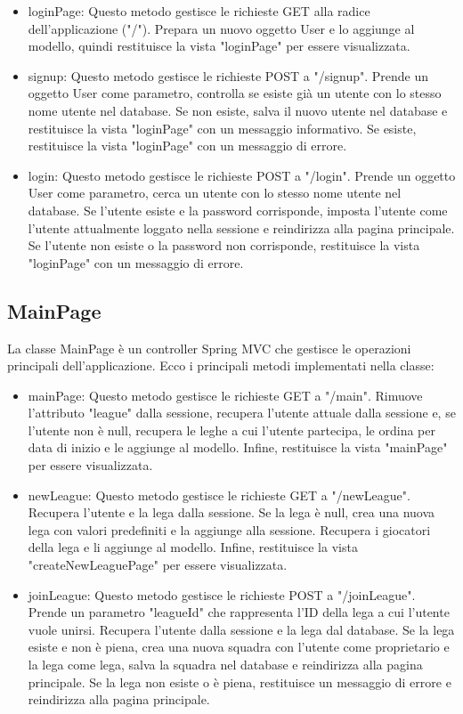 \documentclass[twoside,openright,titlepage,fleqn,headinclude,12pt,a4paper,BCOR=5mm,footinclude]{scrbook}
\begin{document}
\begin{itemize}

    \item loginPage: Questo metodo gestisce le richieste GET alla radice dell'applicazione ("/"). Prepara un nuovo oggetto User e lo aggiunge al modello, quindi restituisce la vista "loginPage" per essere visualizzata. 
 
    \item signup: Questo metodo gestisce le richieste POST a "/signup". Prende un oggetto User come parametro, controlla se esiste già un utente con lo stesso nome utente nel database. Se non esiste, salva il nuovo utente nel database e restituisce la vista "loginPage" con un messaggio informativo. Se esiste, restituisce la vista "loginPage" con un messaggio di errore.  
    
    \item login: Questo metodo gestisce le richieste POST a "/login". Prende un oggetto User come parametro, cerca un utente con lo stesso nome utente nel database. Se l'utente esiste e la password corrisponde, imposta l'utente come l'utente attualmente loggato nella sessione e reindirizza alla pagina principale. Se l'utente non esiste o la password non corrisponde, restituisce la vista "loginPage" con un messaggio di errore. 

\end{itemize}

\subsection{MainPage} 
La classe MainPage è un controller Spring MVC che gestisce le operazioni principali dell'applicazione. Ecco i principali metodi implementati nella classe:  
\begin{itemize}  
    \item mainPage: Questo metodo gestisce le richieste GET a "/main". Rimuove l'attributo "league" dalla sessione, recupera l'utente attuale dalla sessione e, se l'utente non è null, recupera le leghe a cui l'utente partecipa, le ordina per data di inizio e le aggiunge al modello. Infine, restituisce la vista "mainPage" per essere visualizzata. 
    \item newLeague: Questo metodo gestisce le richieste GET a "/newLeague". Recupera l'utente e la lega dalla sessione. Se la lega è null, crea una nuova lega con valori predefiniti e la aggiunge alla sessione. Recupera i giocatori della lega e li aggiunge al modello. Infine, restituisce la vista "createNewLeaguePage" per essere visualizzata. 
    \item joinLeague: Questo metodo gestisce le richieste POST a "/joinLeague". Prende un parametro "leagueId" che rappresenta l'ID della lega a cui l'utente vuole unirsi. Recupera l'utente dalla sessione e la lega dal database. Se la lega esiste e non è piena, crea una nuova squadra con l'utente come proprietario e la lega come lega, salva la squadra nel database e reindirizza alla pagina principale. Se la lega non esiste o è piena, restituisce un messaggio di errore e reindirizza alla pagina principale.
\end{itemize}
\end{document}
